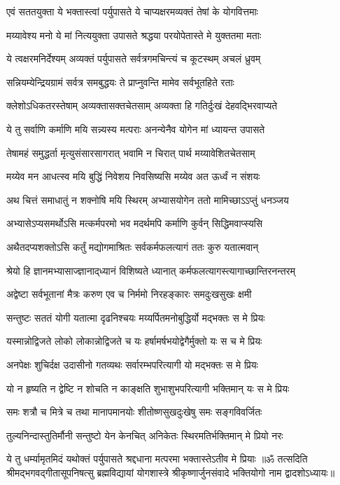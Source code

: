 \twolineshloka
{एवं सततयुक्ता ये भक्तास्त्वां पर्युपासते}
{ये चाप्यक्षरमव्यक्तं तेषां के योगवित्तमाः}%

\twolineshloka
{मय्यावेश्य मनो ये मां नित्ययुक्ता उपासते}
{श्रद्धया परयोपेतास्ते मे युक्ततमा मताः}%

\twolineshloka
{ये त्वक्षरमनिर्देश्यम् अव्यक्तं पर्युपासते}
{सर्वत्रगमचिन्त्यं च कूटस्थम् अचलं ध्रुवम्}%

\twolineshloka
{सन्नियम्येन्द्रियग्रामं सर्वत्र समबुद्धयः}
{ते प्राप्नुवन्ति मामेव सर्वभूतहिते रताः}%

\twolineshloka
{क्लेशोऽधिकतरस्तेषाम् अव्यक्तासक्तचेतसाम्}%
{अव्यक्ता हि गतिर्दुःखं देहवद्भिरवाप्यते}%

\twolineshloka
{ये तु सर्वाणि कर्माणि मयि सन्न्यस्य मत्पराः}
{अनन्येनैव योगेन मां ध्यायन्त उपासते}%

\twolineshloka
{तेषामहं समुद्धर्ता मृत्युसंसारसागरात्}
{भवामि न चिरात् पार्थ मय्यावेशितचेतसाम्}%

\twolineshloka
{मय्येव मन आधत्स्व मयि बुद्धिं निवेशय}
{निवसिष्यसि मय्येव अत ऊर्ध्वं न संशयः}%

\twolineshloka
{अथ चित्तं समाधातुं न शक्नोषि मयि स्थिरम्}
{अभ्यासयोगेन ततो मामिच्छाऽऽप्तुं धनञ्जय}%

\twolineshloka
{अभ्यासेऽप्यसमर्थोऽसि मत्कर्मपरमो भव}
{मदर्थमपि कर्माणि कुर्वन् सिद्धिमवाप्स्यसि}%

\twolineshloka
{अथैतदप्यशक्तोऽसि कर्तुं मद्योगमाश्रितः}
{सर्वकर्मफलत्यागं ततः कुरु यतात्मवान्}%

\twolineshloka
{श्रेयो हि ज्ञानमभ्यासाज्ज्ञानाद्‌ध्यानं विशिष्यते}
{ध्यानात् कर्मफलत्यागस्त्यागाच्छान्तिरनन्तरम्}%

\twolineshloka
{अद्वेष्टा सर्वभूतानां मैत्रः करुण एव च}
{निर्ममो निरहङ्कारः समदुःखसुखः क्षमी}%

\twolineshloka
{सन्तुष्टः सततं योगी यतात्मा दृढनिश्चयः}
{मय्यर्पितमनोबुद्धिर्यो मद्भक्तः स मे प्रियः}%

\twolineshloka
{यस्मान्नोद्विजते लोको लोकान्नोद्विजते च यः}
{हर्षामर्षभयोद्वेगैर्मुक्तो यः स च मे प्रियः}%

\twolineshloka
{अनपेक्षः शुचिर्दक्ष उदासीनो गतव्यथः}
{सर्वारम्भपरित्यागी यो मद्भक्तः स मे प्रियः}%

\twolineshloka
{यो न हृष्यति न द्वेष्टि न शोचति न काङ्क्षति}
{शुभाशुभपरित्यागी भक्तिमान् यः स मे प्रियः}%

\twolineshloka
{समः शत्रौ च मित्रे च तथा मानापमानयोः}
{शीतोष्णसुखदुःखेषु समः सङ्गविवर्जितः}%

\twolineshloka
{तुल्यनिन्दास्तुतिर्मौनी सन्तुष्टो येन केनचित्}
{अनिकेतः स्थिरमतिर्भक्तिमान् मे प्रियो नरः}%

\twolineshloka
{ये तु धर्म्यामृतमिदं यथोक्तं पर्युपासते}
{श्रद्दधाना मत्परमा भक्तास्तेऽतीव मे प्रियाः}%
{॥ॐ तत्सदिति श्रीमद्भगवद्गीतासूपनिषत्सु ब्रह्मविद्यायां योगशास्त्रे श्रीकृष्णार्जुनसंवादे भक्तियोगो नाम द्वादशोऽध्यायः॥}